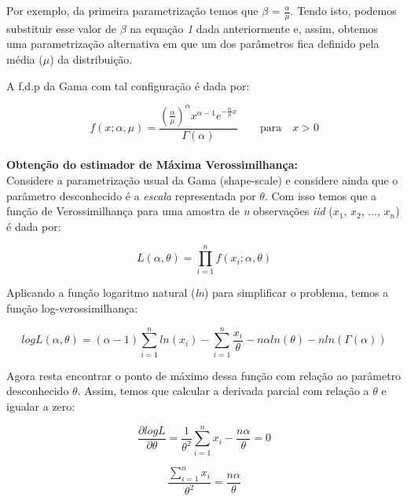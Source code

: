 Por exemplo, da primeira parametrização temos que $\beta$ = $\frac{\alpha}{\mu}$. Tendo isto, podemos substituir esse valor de $\beta$ na equação \emph{1} dada anteriormente e, assim, obtemos uma parametrização alternativa em que um dos parâmetros fica definido pela média ($\mu$) da distribuição.

A f.d.p da Gama com tal configuração é dada por:

\begin{equation}
f(x; \alpha, \mu )=\frac{(\frac{\alpha}{\mu})^{\alpha}x^{\alpha-1}e^{-\frac{\alpha}{\mu} x}}{\Gamma(\alpha)} \qquad \text{para} \quad x > 0
\end{equation}\\

\textbf{Obtenção do estimador de Máxima Verossimilhança:}\\

Considere a parametrização usual da Gama (shape-scale) e considere ainda que o parâmetro desconhecido é a \textit{escala} representada por $\theta$. Com isso temos que a função de Verossimilhança para uma amostra de \emph{n} observações \emph{iid} ($x_1$, $x_2$, ..., $x_n$) é dada por:

\begin{equation}
L(\alpha, \theta) = \prod_{i=1}^{n} f(x_i; \alpha, \theta)
\end{equation}

Aplicando a função logaritmo natural (\textit{ln}) para simplificar o problema, temos  a função log-verossimilhança:

\begin{equation}
logL(\alpha, \theta) = (\alpha-1) \sum_{i=1}^{n} ln(x_i) - \sum_{i=1}^{n} \frac{x_i}{\theta} - n \alpha ln(\theta) - n ln(\Gamma(\alpha))
\end{equation}

Agora resta encontrar o ponto de máximo dessa função com relação ao parâmetro desconhecido $\theta$. Assim, temos que calcular a derivada parcial com relação a $\theta$ e igualar a zero:

\begin{equation}
\frac{\partial logL}{\partial \theta} = \frac{1}{\theta^2}\sum_{i=1}^{n}x_i - \frac{n\alpha}{\theta} = 0
\end{equation}

\begin{equation}
\frac{\sum_{i=1}^{n}x_i}{\theta^2} = \frac{n\alpha}{\theta} 
\end{equation}\\

